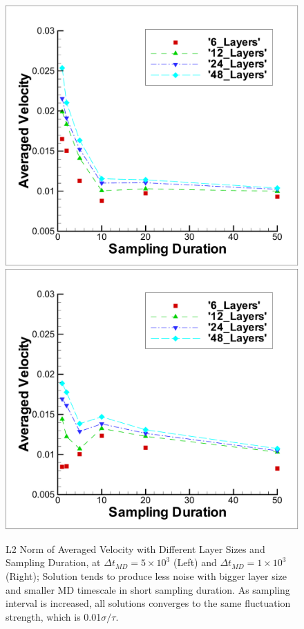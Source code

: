 \documentclass[conference,final]{IEEEtran}
\begin{document}
%
\begin{figure}[ht]
\centering
\includegraphics[width=0.9\linewidth]{MD_Regular_Vel0_5e-3.pdf}
\hskip 1cm
\includegraphics[width=0.9\linewidth]{MD_Regular_Vel0_1e-3.pdf}
\vskip-0.2cm
\caption{\small L2 Norm of Averaged Velocity with Different Layer Sizes and Sampling Duration, at $\Delta{t_{MD}}=5\times{10^{3}}$ (Left) and $\Delta{t_{MD}}=1\times{10^{3}}$ (Right); Solution tends to produce less noise with bigger layer size and smaller MD timescale in short sampling duration. As sampling interval is increased, all solutions converges to the same fluctuation strength, which is 0.01$\sigma/\tau$.}
\label{MD_Regular_Vel0}
\end{figure}
\end{document}

